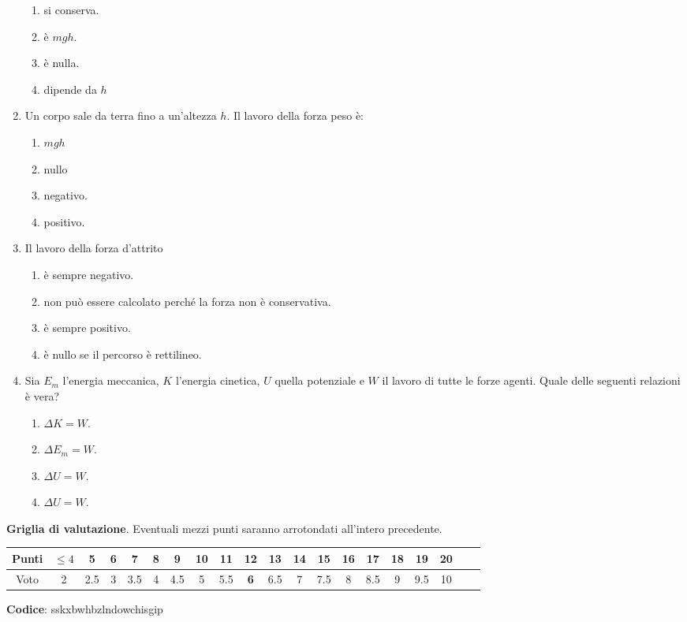 \documentclass{article}
\begin{document}
\begin{enumerate}
  \begin{enumerate}[label=\Alph*.]
    \item si conserva.
    \item è $mgh$.
    \item è nulla.
    \item dipende da $h$
  \end{enumerate}
  \item Un corpo sale da terra fino a un'altezza $h$. Il lavoro della forza peso è:
  \begin{enumerate}[label=\Alph*.]
    \item $mgh$
    \item nullo
    \item negativo.
    \item positivo.
  \end{enumerate}
  \item Il lavoro della forza d'attrito
  \begin{enumerate}[label=\Alph*.]
    \item è sempre negativo.
    \item non può essere calcolato perché la forza non è conservativa.
    \item è sempre positivo.
    \item è nullo se il percorso è rettilineo.
  \end{enumerate}
  \item Sia $E_m$ l'energia meccanica, $K$ l'energia cinetica, $U$ quella potenziale e $W$ il lavoro di tutte le forze agenti. Quale delle seguenti relazioni è vera?
  \begin{enumerate}[label=\Alph*.]
    \item $\Delta K=W.$
    \item $\Delta E_m=W$.
    \item $\Delta U=W$.
    \item $\Delta U=W$.
  \end{enumerate}
\end{enumerate}








\newpage \maketitle \centering \textbf{Griglia di valutazione}. Eventuali mezzi punti saranno arrotondati all'intero precedente. \begin{table}[h]     \centering \begin{tabular}{|c|c|c|c|c|c|c|c|c|c|c|c|c|c|c|c|c|c|c|c|} \hline Punti &  $\leq 4$ & 5 & 6 & 7 & 8 & 9 & 10 & 11 & \textbf{12} & 13 & 14 & 15 & 16 & 17 & 18 & 19 & 20 \\ \hline Voto & 2 & 2.5 & 3 & 3.5 & 4 & 4.5 & 5 & 5.5 & \textbf{6} & 6.5 & 7 & 7.5 & 8 & 8.5 & 9 & 9.5 & 10 \\ \hline \end{tabular} \end{table}
\textbf{Codice}: sskxbwhbzlndowchisgip
\end{document}
